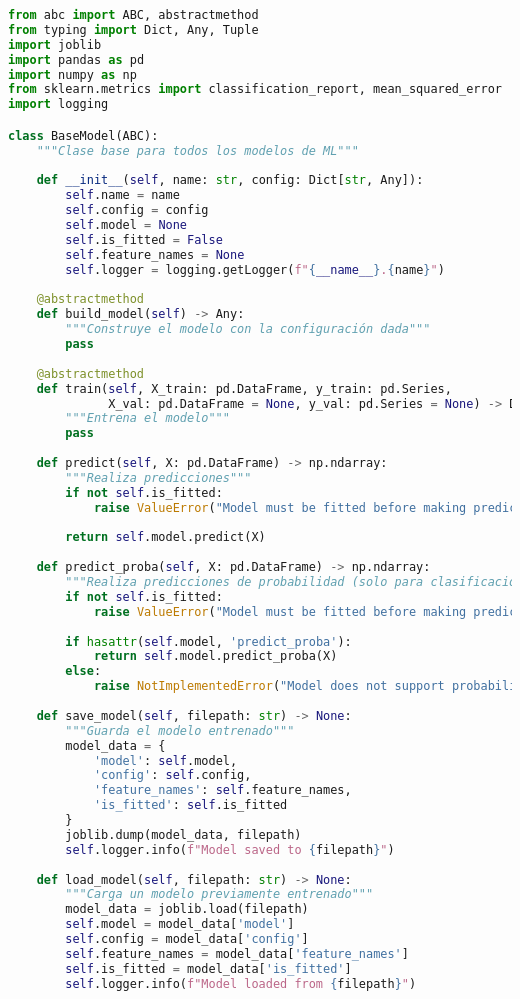 \begin{lstlisting}[language=Python, caption=Arquitectura base para modelos de ML]
from abc import ABC, abstractmethod
from typing import Dict, Any, Tuple
import joblib
import pandas as pd
import numpy as np
from sklearn.metrics import classification_report, mean_squared_error
import logging

class BaseModel(ABC):
    """Clase base para todos los modelos de ML"""
    
    def __init__(self, name: str, config: Dict[str, Any]):
        self.name = name
        self.config = config
        self.model = None
        self.is_fitted = False
        self.feature_names = None
        self.logger = logging.getLogger(f"{__name__}.{name}")
    
    @abstractmethod
    def build_model(self) -> Any:
        """Construye el modelo con la configuración dada"""
        pass
    
    @abstractmethod
    def train(self, X_train: pd.DataFrame, y_train: pd.Series, 
              X_val: pd.DataFrame = None, y_val: pd.Series = None) -> Dict[str, Any]:
        """Entrena el modelo"""
        pass
    
    def predict(self, X: pd.DataFrame) -> np.ndarray:
        """Realiza predicciones"""
        if not self.is_fitted:
            raise ValueError("Model must be fitted before making predictions")
        
        return self.model.predict(X)
    
    def predict_proba(self, X: pd.DataFrame) -> np.ndarray:
        """Realiza predicciones de probabilidad (solo para clasificación)"""
        if not self.is_fitted:
            raise ValueError("Model must be fitted before making predictions")
        
        if hasattr(self.model, 'predict_proba'):
            return self.model.predict_proba(X)
        else:
            raise NotImplementedError("Model does not support probability predictions")
    
    def save_model(self, filepath: str) -> None:
        """Guarda el modelo entrenado"""
        model_data = {
            'model': self.model,
            'config': self.config,
            'feature_names': self.feature_names,
            'is_fitted': self.is_fitted
        }
        joblib.dump(model_data, filepath)
        self.logger.info(f"Model saved to {filepath}")
    
    def load_model(self, filepath: str) -> None:
        """Carga un modelo previamente entrenado"""
        model_data = joblib.load(filepath)
        self.model = model_data['model']
        self.config = model_data['config']
        self.feature_names = model_data['feature_names']
        self.is_fitted = model_data['is_fitted']
        self.logger.info(f"Model loaded from {filepath}")
    

\end{lstlisting}
